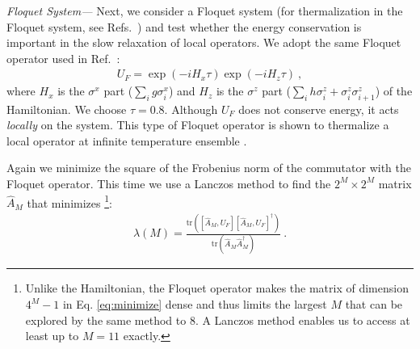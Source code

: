 \documentclass[twocolumn,superscriptaddress, prb]{revtex4-1}
\begin{document}
%

{\it Floquet System---}
Next, we consider a Floquet system (for thermalization in the Floquet system, see Refs.~) and test whether the energy conservation is important in the slow relaxation of local operators.
We adopt the same Floquet operator used in Ref.~:
\begin{align}
U_F = \exp(-i H_x \tau) \exp(-i H_z \tau) ~,
\end{align}
where $H_x$ is the $\sigma^x$ part ($\sum_i g \sigma^x_i$) and $H_z$ is the $\sigma^z$ part ($\sum_i h \sigma^z_i +\sigma^z_i \sigma^z_{i+1}$)
of the Hamiltonian. We choose $\tau = 0.8$.
Although $U_F$ does not conserve energy, it acts {\it locally} on the system.
This type of Floquet operator is shown to thermalize a local operator at infinite temperature ensemble \cite{Kim_ETH,Prosen:2002}.

Again we minimize the square of the Frobenius norm of the commutator with the Floquet operator.
This time we use a Lanczos method to find the $2^M \times 2^M$ matrix $\hat{A}_M$
that minimizes \footnote{Unlike the Hamiltonian, the Floquet operator makes the matrix of dimension $4^M-1$ in Eq. \eqref{eq:minimize} dense and thus
limits the largest $M$ that can be explored by the same method to 8. A Lanczos method enables us to access at least up to $M = 11$ exactly.}:
\begin{align}\label{eq:floquet_minimize}
\lambda(M) = \frac{\mathrm{tr}([\hat{A}_M,U_F][\hat{A}_M,U_F]^\dag)}{\mathrm{tr}(\hat{A}_M\hat{A}_M^\dag)} ~.
\end{align}
\end{document}
